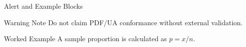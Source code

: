\documentclass[14pt,t]{beamer-accessibility}
\begin{document}
\begin{frame}{Alert and Example Blocks}
\begin{alertblock}{Warning Note}
Do not claim PDF/UA conformance without external validation.
\end{alertblock}

\begin{exampleblock}{Worked Example}
A sample proportion is calculated as $p = x / n$.
\end{exampleblock}
\end{frame}
\end{document}

